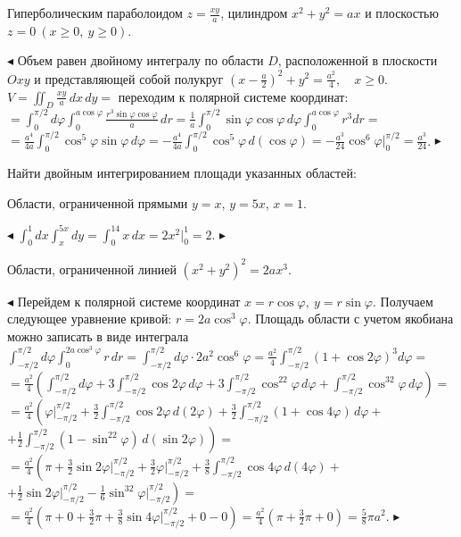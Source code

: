 \documentclass[a5paper,10pt]{article}
\begin{document}
\medskip
{} Гиперболическим параболоидом $\displaystyle z=\frac{xy}{a}$,
цилиндром $x^2+y^2=ax$ и плоскостью $z=0\ (x\ge0,\ y\ge0)$.

\smallskip
\noindent $\blacktriangleleft$ Объем равен двойному интегралу по области $D$, расположенной в плоскости
$Oxy$ и представляющей собой полукруг $\displaystyle\left(x-\frac a2\right)^2+y^2=\frac{a^2}{4},\quad x\ge0$.\\
$\displaystyle V=\iint_D\frac{xy}{a}\,dx\,dy=$ переходим к полярной системе координат:\\
$\displaystyle=\int_{0}^{\pi/2}d\varphi\int_0^{a\cos\varphi}\frac{r^3\sin\varphi\cos\varphi}{a}\,dr
=\frac1a\int_{0}^{\pi/2}\sin\varphi\cos\varphi\,d\varphi\int_0^{a\cos\varphi}{r^3}dr=$\\
$\displaystyle=\frac{a^4}{4a}\int_{0}^{\pi/2}\cos^5\varphi\sin\varphi\,d\varphi=
-\frac{a^4}{4a}\int_{0}^{\pi/2}\cos^5\varphi\,d(\cos\varphi)=
-\frac{a^3}{24}\cos^6\varphi\Big|_{0}^{\pi/2}=\frac{a^3}{24}$.
$\blacktriangleright$

\medskip
\noindent Найти двойным интегрированием площади указанных областей:

\medskip
{} Области, ограниченной прямыми $y=x$, $y=5x$, $x=1$.

\smallskip
\noindent $\blacktriangleleft$ $\displaystyle\int_0^1dx\int_x^{5x}dy=\int_0^14x\,dx=2x^2\Big|_0^1=2.$ $\blacktriangleright$

\medskip
{} Области, ограниченной линией $(x^2+y^2)^2=2ax^3$.

\smallskip
\noindent $\blacktriangleleft$ Перейдем к полярной системе координат $x=r\cos \varphi,\ y=r\sin\varphi.$
Получаем следующее уравнение кривой: $r=2a\cos^3\varphi.$ Площадь области с учетом якобиана можно
записать в виде интеграла\\
$\displaystyle \int_{-\pi/2}^{\pi/2}d\varphi\int_0^{2a\cos^3\varphi}r\,dr=
\int_{-\pi/2}^{\pi/2}d\varphi\cdot 2a^2\cos^6\varphi=
\frac{a^2}{4}\int_{-\pi/2}^{\pi/2}(1+\cos2\varphi)^3d\varphi=$\\
$\displaystyle =\frac{a^2}{4}\left(\int_{-\pi/2}^{\pi/2}d\varphi+3\int_{-\pi/2}^{\pi/2}\cos2\varphi\,d\varphi+
3\int_{-\pi/2}^{\pi/2}\cos^22\varphi\,d\varphi+\int_{-\pi/2}^{\pi/2}\cos^32\varphi\,d\varphi\right)=$\\
$\displaystyle =\frac{a^2}{4}\left(\varphi\Big|_{-\pi/2}^{\pi/2}+\frac32\int_{-\pi/2}^{\pi/2}\cos2\varphi\,d(2\varphi)+
\frac32\int_{-\pi/2}^{\pi/2}(1+\cos4\varphi)\,d\varphi+\right.$\\
$\displaystyle \left.+\frac12\int_{-\pi/2}^{\pi/2}(1-\sin^22\varphi)\,d(\sin2\varphi)\right)=$\\
$\displaystyle =\frac{a^2}{4}\left(\pi+\frac32\sin2\varphi\Big|_{-\pi/2}^{\pi/2}+
\frac32\varphi\Big|_{-\pi/2}^{\pi/2}+\frac38\int_{-\pi/2}^{\pi/2}\cos4\varphi\,d(4\varphi)+\right.$\\
$\displaystyle \left.+\frac12\sin2\varphi\Big|_{-\pi/2}^{\pi/2}-\frac16\sin^32\varphi\Big|_{-\pi/2}^{\pi/2}\right)=$\\
$\displaystyle =\frac{a^2}{4}\left(\pi+0+
\frac32\pi+\frac38\sin4\varphi\Big|_{-\pi/2}^{\pi/2}+0-0\right)=
\frac{a^2}{4}\left(\pi+\frac32\pi+0\right)=\frac58\pi a^2$.
$\blacktriangleright$
\end{document}

